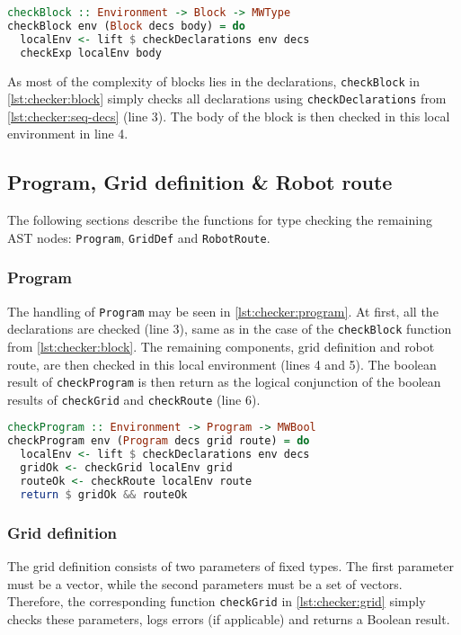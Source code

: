 \begin{lstlisting}[language=haskell,
caption={Handler for blocks},
label=lst:checker:block]
checkBlock :: Environment -> Block -> MWType
checkBlock env (Block decs body) = do
  localEnv <- lift $ checkDeclarations env decs
  checkExp localEnv body
\end{lstlisting}

\par As most of the complexity of blocks lies in the declarations, \lstinline{checkBlock} in \cref{lst:checker:block} simply checks all declarations using \lstinline{checkDeclarations} from \cref{lst:checker:seq-decs} (line 3). The body of the block is then checked in this local environment in line 4.  

\subsection{Program, Grid definition \& Robot route}
The following sections describe the functions for type checking the remaining AST nodes: \lstinline{Program}, \lstinline{GridDef} and \lstinline{RobotRoute}. 

\subsubsection{Program}
The handling of \lstinline{Program} may be seen in \cref{lst:checker:program}. At first, all the declarations are checked (line 3), same as in the case of the \lstinline{checkBlock} function from \cref{lst:checker:block}. The remaining components, grid definition and  robot route, are then checked in this local environment (lines 4 and 5). The boolean result of \lstinline{checkProgram} is then return as the logical conjunction of the boolean results of \lstinline{checkGrid} and \lstinline{checkRoute} (line 6).

\begin{lstlisting}[language=haskell,
caption={Handler for AST root},
label=lst:checker:program]
checkProgram :: Environment -> Program -> MWBool
checkProgram env (Program decs grid route) = do
  localEnv <- lift $ checkDeclarations env decs
  gridOk <- checkGrid localEnv grid
  routeOk <- checkRoute localEnv route
  return $ gridOk && routeOk
\end{lstlisting}

\subsubsection{Grid definition}
The grid definition consists of two parameters of fixed types. The first parameter must be a vector, while the second parameters must be a set of vectors. Therefore, the corresponding function \lstinline{checkGrid} in \cref{lst:checker:grid} simply checks these parameters, logs errors (if applicable) and returns a Boolean result. 

